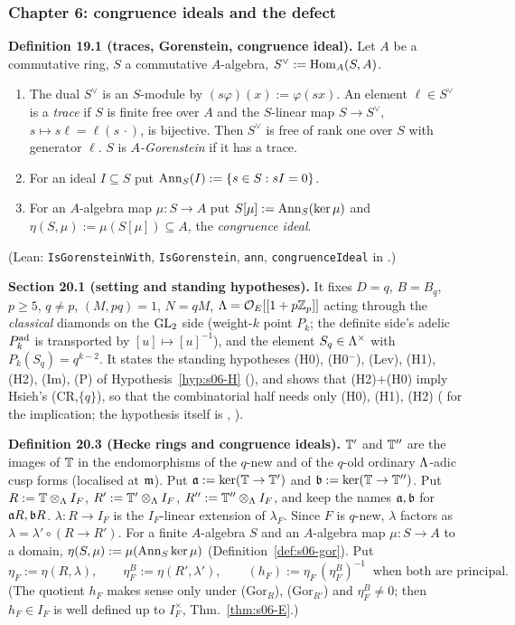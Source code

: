 \subsubsection*{Chapter 6: congruence ideals and the defect}

\noindent{}\label{rpt:def:s06-gor}\textbf{Definition 19.1 (traces, Gorenstein, congruence ideal).}
Let $A$ be a commutative ring, $S$ a commutative $A$-algebra, $S^\vee:=\operatorname{Hom}_A(S,A)$.
\begin{enumerate}[label=(\alph*)]
\item The dual $S^\vee$ is an $S$-module by $(s\varphi)(x):=\varphi(sx)$. An element $\ell\in S^\vee$ is a \emph{trace} if $S$ is finite
  free over $A$ and the $S$-linear map $S\to S^\vee$, $s\mapsto s\ell=\ell(s\,\cdot)$, is bijective. Then $S^\vee$ is free of rank one over
  $S$ with generator $\ell$. $S$ is \emph{$A$-Gorenstein} if it has a trace.
\item For an ideal $I\subseteq S$ put $\operatorname{Ann}_S(I):=\{s\in S:sI=0\}$.
\item For an $A$-algebra map $\mu:S\to A$ put $S[\mu]:=\operatorname{Ann}_S(\ker\mu)$ and $\eta(S,\mu):=\mu(S[\mu])\subseteq A$, the
  \emph{congruence ideal}.
\end{enumerate}
 (Lean: \texttt{IsGorensteinWith}, \texttt{IsGorenstein}, \texttt{ann}, \texttt{congruenceIdeal} in
.)

\medskip
\noindent{}\label{rpt:ss:s06-setting}\textbf{Section 20.1 (setting and standing hypotheses).}
It fixes $D=q$, $B=B_q$, $p\ge5$, $q\ne p$, $(M,pq)=1$, $N=qM$, $\Lambda=\mathcal{O}_E[[1+p\mathbb{Z}_p]]$ acting through the \emph{classical} diamonds on the
$\mathrm{GL}_2$ side (weight-$k$ point $P_k$; the definite side's adelic $P^{\rm ad}_k$ is transported by $[u]\mapsto[u]^{-1}$), and the element
$S_q\in\Lambda^\times$ with $P_k(S_q)=q^{k-2}$. It states the standing hypotheses (H0), (H0$^-$), (Lev), (H1), (H2), (Im), (P) of
Hypothesis~\ref{hyp:s06-H} (\sthyp), and shows that (H2)$+$(H0) imply Hsieh's (CR,$\{q\}$), so that the combinatorial half needs only (H0),
(H1), (H2) (\stproved{} for the implication; the hypothesis itself is \stcited, \cite[\S1.4]{Hs}).

\medskip
\noindent{}\label{rpt:def:s06-rings}\textbf{Definition 20.3 (Hecke rings and congruence ideals).}
$\mathbb{T}'$ and $\mathbb{T}''$ are the images of $\mathbb{T}$ in the endomorphisms of the $q$-new and of the $q$-old ordinary $\Lambda$-adic cusp forms
(localised at $\mathfrak{m}$). Put $\mathfrak{a}:=\ker(\mathbb{T}\to\mathbb{T}')$ and $\mathfrak{b}:=\ker(\mathbb{T}\to\mathbb{T}'')$. Put $R:=\mathbb{T}\otimes_\Lambda I_F$, $R':=\mathbb{T}'\otimes_\Lambda I_F$,
$R'':=\mathbb{T}''\otimes_\Lambda I_F$, and keep the names $\mathfrak{a},\mathfrak{b}$ for $\mathfrak{a} R,\mathfrak{b} R$. $\lambda:R\to I_F$ is the $I_F$-linear extension of
$\lambda_F$. Since $F$ is $q$-new, $\lambda$ factors as $\lambda=\lambda'\circ(R\to R')$. For a finite $A$-algebra $S$ and an
$A$-algebra map $\mu:S\to A$ to a domain, $\eta(S,\mu):=\mu(\operatorname{Ann}_S\ker\mu)$ (Definition~\ref{def:s06-gor}). Put
\[\eta_F:=\eta(R,\lambda),\qquad \eta^B_F:=\eta(R',\lambda'),\qquad (h_F):=\eta_F\,(\eta^B_F)^{-1}\ \text{ when both are principal.}\]
 (The quotient $h_F$ makes sense only under (Gor$_R$), (Gor$_{R'}$) and $\eta^B_F\ne0$; then $h_F\in I_F$ is well
defined up to $I_F^\times$, Thm.~\ref{thm:s06-E}.)


